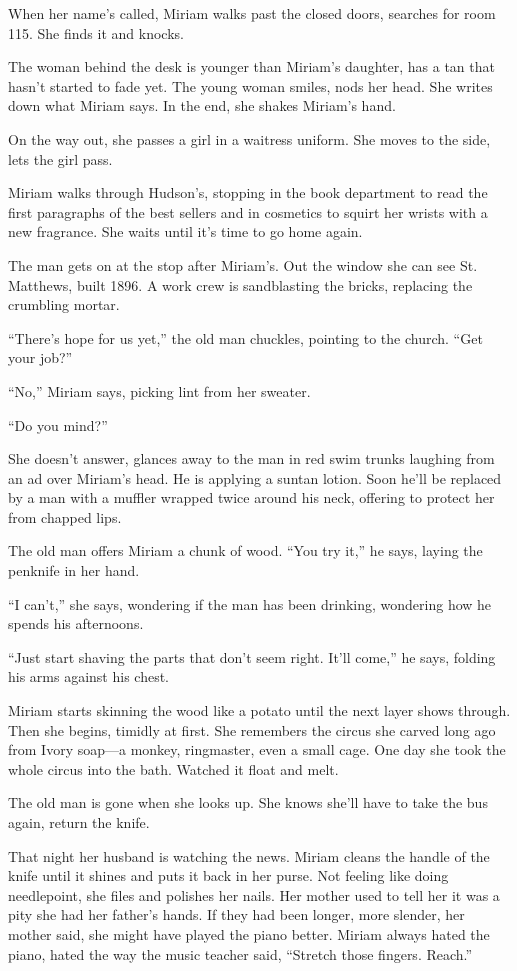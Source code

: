 \documentclass[twoside,10pt]{book}
\begin{document}
When her name's called, Miriam walks past the closed doors, searches for
room 115. She finds it and knocks.

The woman behind the desk is younger than Miriam's daughter, has a tan
that hasn't started to fade yet. The young woman smiles, nods her head.
She writes down what Miriam says. In the end, she shakes Miriam's hand.

On the way out, she passes a girl in a waitress uniform. She moves to
the side, lets the girl pass.

Miriam walks through Hudson's, stopping in the book department to read
the first paragraphs of the best sellers and in cosmetics to squirt her
wrists with a new fragrance. She waits until it's time to go home again.

The man gets on at the stop after Miriam's. Out the window she can see
St. Matthews, built 1896. A work crew is sandblasting the bricks,
replacing the crumbling mortar.

``There's hope for us yet,'' the old man chuckles, pointing to the
church. ``Get your job?''

``No,'' Miriam says, picking lint from her sweater.

``Do you mind?''

She doesn't answer, glances away to the man in red swim trunks laughing
from an ad over Miriam's head. He is applying a suntan lotion. Soon
he'll be replaced by a man with a muffler wrapped twice around his neck,
offering to protect her from chapped lips.

The old man offers Miriam a chunk of wood. ``You try it,'' he says,
laying the penknife in her hand.

``I can't,'' she says, wondering if the man has been drinking, wondering
how he spends his afternoons.

``Just start shaving the parts that don't seem right. It'll come,'' he
says, folding his arms against his chest.

Miriam starts skinning the wood like a potato until the next layer shows
through. Then she begins, timidly at first. She remembers the circus she
carved long ago from Ivory soap---a monkey, ringmaster, even a small
cage. One day she took the whole circus into the bath. Watched it float
and melt.

The old man is gone when she looks up. She knows she'll have to take the
bus again, return the knife.

That night her husband is watching the news. Miriam cleans the handle of
the knife until it shines and puts it back in her purse. Not feeling
like doing needlepoint, she files and polishes her nails. Her mother
used to tell her it was a pity she had her father's hands. If they had
been longer, more slender, her mother said, she might have played the
piano better. Miriam always hated the piano, hated the way the music
teacher said, ``Stretch those fingers. Reach.''
\end{document}
